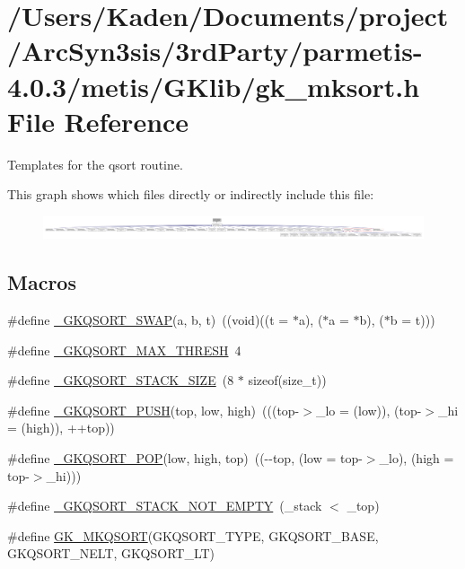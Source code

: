 \hypertarget{a00071}{}\section{/\+Users/\+Kaden/\+Documents/project/\+Arc\+Syn3sis/3rd\+Party/parmetis-\/4.0.3/metis/\+G\+Klib/gk\+\_\+mksort.h File Reference}
\label{a00071}


Templates for the qsort routine.  


This graph shows which files directly or indirectly include this file\+:\nopagebreak
\begin{figure}[H]
\begin{center}
\leavevmode
\includegraphics[width=350pt]{a00073}
\end{center}
\end{figure}
\subsection*{Macros}
\begin{DoxyCompactItemize}
\item 
\#define \hyperlink{a00071_ad3ac0c6322a2bc1c81d4bf1f56317550}{\+\_\+\+G\+K\+Q\+S\+O\+R\+T\+\_\+\+S\+W\+AP}(a,  b,  t)~((void)((t = $\ast$a), ($\ast$a = $\ast$b), ($\ast$b = t)))
\item 
\#define \hyperlink{a00071_a43b8aac87db5c2969428fbc7248519ca}{\+\_\+\+G\+K\+Q\+S\+O\+R\+T\+\_\+\+M\+A\+X\+\_\+\+T\+H\+R\+E\+SH}~4
\item 
\#define \hyperlink{a00071_ac21ca46c1b863f0588270f3605f35387}{\+\_\+\+G\+K\+Q\+S\+O\+R\+T\+\_\+\+S\+T\+A\+C\+K\+\_\+\+S\+I\+ZE}~(8 $\ast$ sizeof(size\+\_\+t))
\item 
\#define \hyperlink{a00071_ac23b0e072b41f6eb655bc4a1c850c9ef}{\+\_\+\+G\+K\+Q\+S\+O\+R\+T\+\_\+\+P\+U\+SH}(top,  low,  high)~(((top-\/$>$\+\_\+lo = (low)), (top-\/$>$\+\_\+hi = (high)), ++top))
\item 
\#define \hyperlink{a00071_af72e9377f158204172842cd4e01a7d4b}{\+\_\+\+G\+K\+Q\+S\+O\+R\+T\+\_\+\+P\+OP}(low,  high,  top)~((-\/-\/top, (low = top-\/$>$\+\_\+lo), (high = top-\/$>$\+\_\+hi)))
\item 
\#define \hyperlink{a00071_a34111d68801790e5adbee9d0e0ae17b5}{\+\_\+\+G\+K\+Q\+S\+O\+R\+T\+\_\+\+S\+T\+A\+C\+K\+\_\+\+N\+O\+T\+\_\+\+E\+M\+P\+TY}~(\+\_\+stack $<$ \+\_\+top)
\item 
\#define \hyperlink{a00071_a417bebefb2d8cd05880e85fe975bee02}{G\+K\+\_\+\+M\+K\+Q\+S\+O\+RT}(G\+K\+Q\+S\+O\+R\+T\+\_\+\+T\+Y\+PE,  G\+K\+Q\+S\+O\+R\+T\+\_\+\+B\+A\+SE,  G\+K\+Q\+S\+O\+R\+T\+\_\+\+N\+E\+LT,  G\+K\+Q\+S\+O\+R\+T\+\_\+\+LT)
\end{DoxyCompactItemize}


